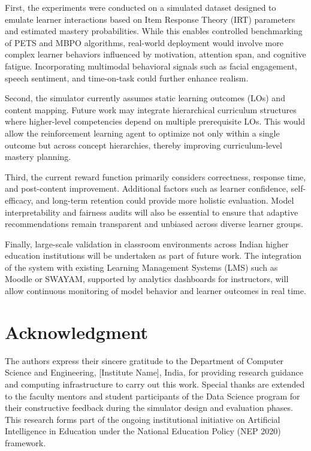 \documentclass[preprint,12pt]{elsarticle}
\begin{document}
\begin{frontmatter}
First, the experiments were conducted on a simulated dataset designed to emulate learner interactions based on Item Response Theory (IRT) parameters and estimated mastery probabilities. While this enables controlled benchmarking of PETS and MBPO algorithms, real-world deployment would involve more complex learner behaviors influenced by motivation, attention span, and cognitive fatigue. Incorporating multimodal behavioral signals such as facial engagement, speech sentiment, and time-on-task could further enhance realism.

Second, the simulator currently assumes static learning outcomes (LOs) and content mapping. Future work may integrate hierarchical curriculum structures where higher-level competencies depend on multiple prerequisite LOs. This would allow the reinforcement learning agent to optimize not only within a single outcome but across concept hierarchies, thereby improving curriculum-level mastery planning.

Third, the current reward function primarily considers correctness, response time, and post-content improvement. Additional factors such as learner confidence, self-efficacy, and long-term retention could provide more holistic evaluation. Model interpretability and fairness audits will also be essential to ensure that adaptive recommendations remain transparent and unbiased across diverse learner groups.

Finally, large-scale validation in classroom environments across Indian higher education institutions will be undertaken as part of future work. The integration of the system with existing Learning Management Systems (LMS) such as Moodle or SWAYAM, supported by analytics dashboards for instructors, will allow continuous monitoring of model behavior and learner outcomes in real time.

\section*{Acknowledgment}
The authors express their sincere gratitude to the Department of Computer Science and Engineering, [Institute Name], India, for providing research guidance and computing infrastructure to carry out this work. Special thanks are extended to the faculty mentors and student participants of the Data Science program for their constructive feedback during the simulator design and evaluation phases. This research forms part of the ongoing institutional initiative on Artificial Intelligence in Education under the National Education Policy (NEP 2020) framework.


\end{frontmatter}
\end{document}
